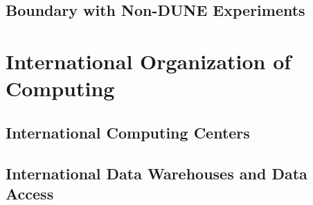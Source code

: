\subsection{Boundary with Non-DUNE Experiments}

\section{International Organization of Computing}
\label{sw:ov-intl-org}

\subsection{International Computing Centers}
\subsection{International Data Warehouses and Data Access}
